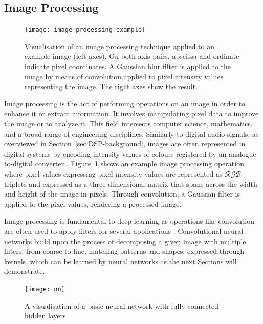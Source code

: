 \subsection{Image Processing}\label{sec:image-processing}
\begin{figure}[htbp]
    \centering
    \texttt{[image: image-processing-example]}
    \caption[Image processing example --- Gaussian filter]{Visualisation of an image processing technique applied to an example image (left axes). On both axis pairs, abscissa and ordinate indicate pixel coordinates. A Gaussian blur filter is applied to the image by means of convolution applied to pixel intensity values representing the image. The right axes show the result.}\label{fig:image-gaussian-filter}
\end{figure}
Image processing is the act of performing operations on an image in order to enhance it or extract information. It involves manipulating pixel data to improve the image or to analyze it. This field intersects computer science, mathematics, and a broad range of engineering disciplines. Similarly to digital audio signals, as overviewed in Section~\ref{sec:DSP-background}, images are often represented in digital systems by encoding intensity values of colours registered by an analogue-to-digital converter \citep{marschner2015fundamentals}.
Figure~\ref{fig:image-gaussian-filter} shows an example image processing operation where pixel values expressing pixel intensity values are represented as $\mathcal{RGB}$ triplets and expressed as a three-dimensional matrix that spans across the width and height of the image in pixels. Through convolution, a Gaussian filter is applied to the pixel values, rendering a processed image.\par
Image processing is fundamental to deep learning as operations like convolution are often used to apply filters for several applications \citep{goodfellow2016deep}. Convolutional neural networks build upon the process of decomposing a given image with multiple filters, from coarse to fine, matching patterns and shapes, expressed through kernels, which can be learned by neural networks as the next Sections will demonstrate.\par

\begin{figure}
    \centering
    \texttt{[image: nn]}
    \caption[Diagram of a fully connected neural network]{A visualisation of a basic neural network with fully connected hidden layers.}\label{fig:nn}
\end{figure}


